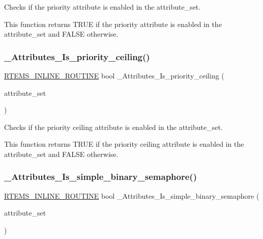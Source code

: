 Checks if the priority attribute is enabled in the attribute\+\_\+set. 

This function returns T\+R\+UE if the priority attribute is enabled in the attribute\+\_\+set and F\+A\+L\+SE otherwise. \mbox{\label{group__ClassicAttributesImpl_gaafe8766d35f2cf356ddfddc16e3ad573}} 
\subsubsection{\texorpdfstring{\_Attributes\_Is\_priority\_ceiling()}{\_Attributes\_Is\_priority\_ceiling()}}
{\footnotesize\ttfamily \mbox{\hyperlink{group__RTEMSScoreBaseDefs_gac216239df231d5dbd15e3520b0b9313f}{R\+T\+E\+M\+S\+\_\+\+I\+N\+L\+I\+N\+E\+\_\+\+R\+O\+U\+T\+I\+NE}} bool \+\_\+\+Attributes\+\_\+\+Is\+\_\+priority\+\_\+ceiling (\begin{DoxyParamCaption}\item[{\mbox{\hyperlink{group__ClassicAttributes_gaea40313cf78ed843e09c4315d0a10f79}{rtems\+\_\+attribute}}}]{attribute\+\_\+set }\end{DoxyParamCaption})}



Checks if the priority ceiling attribute is enabled in the attribute\+\_\+set. 

This function returns T\+R\+UE if the priority ceiling attribute is enabled in the attribute\+\_\+set and F\+A\+L\+SE otherwise. \mbox{\label{group__ClassicAttributesImpl_ga46243ea367a4339919d9100d3f7b620b}} 
\subsubsection{\texorpdfstring{\_Attributes\_Is\_simple\_binary\_semaphore()}{\_Attributes\_Is\_simple\_binary\_semaphore()}}
{\footnotesize\ttfamily \mbox{\hyperlink{group__RTEMSScoreBaseDefs_gac216239df231d5dbd15e3520b0b9313f}{R\+T\+E\+M\+S\+\_\+\+I\+N\+L\+I\+N\+E\+\_\+\+R\+O\+U\+T\+I\+NE}} bool \+\_\+\+Attributes\+\_\+\+Is\+\_\+simple\+\_\+binary\+\_\+semaphore (\begin{DoxyParamCaption}\item[{\mbox{\hyperlink{group__ClassicAttributes_gaea40313cf78ed843e09c4315d0a10f79}{rtems\+\_\+attribute}}}]{attribute\+\_\+set }\end{DoxyParamCaption})}



